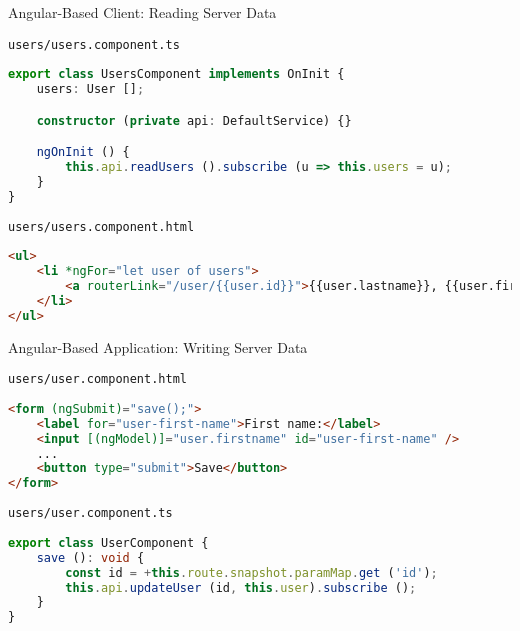 \begin{frame}[fragile]{Angular-Based Client: Reading Server Data}
    \begin{block}{\lstinline{users/users.component.ts}}
\begin{lstlisting}[language=typescript,style=mini]
export class UsersComponent implements OnInit {
    users: User [];

    constructor (private api: DefaultService) {}

    ngOnInit () {
        this.api.readUsers ().subscribe (u => this.users = u);
    }
}
\end{lstlisting}
    \end{block}

    \begin{block}{\lstinline{users/users.component.html}}
\begin{lstlisting}[language=html,style=mini]
<ul>
    <li *ngFor="let user of users">
        <a routerLink="/user/{{user.id}}">{{user.lastname}}, {{user.firstname}}</a>
    </li>
</ul>
\end{lstlisting}
    \end{block}
\end{frame}


\begin{frame}[fragile]{Angular-Based Application: Writing Server Data}
    \begin{block}{\lstinline{users/user.component.html}}
\begin{lstlisting}[language=html,style=mini]
<form (ngSubmit)="save();">
    <label for="user-first-name">First name:</label>
    <input [(ngModel)]="user.firstname" id="user-first-name" />
    ...
    <button type="submit">Save</button>
</form>
\end{lstlisting}
    \end{block}

    \begin{block}{\lstinline{users/user.component.ts}}
\begin{lstlisting}[language=typescript,style=mini]
export class UserComponent {
    save (): void {
        const id = +this.route.snapshot.paramMap.get ('id');
        this.api.updateUser (id, this.user).subscribe ();
    }
}
\end{lstlisting}
    \end{block}
\end{frame}


